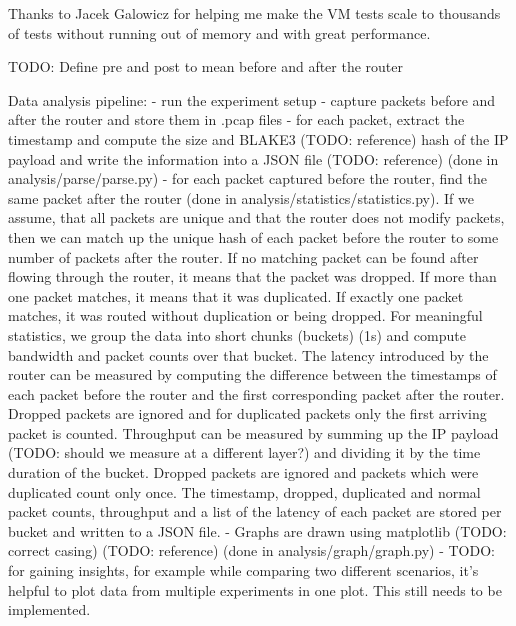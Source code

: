 Thanks to Jacek Galowicz for helping me make the VM tests scale to thousands of tests without running out of memory and with great performance.

TODO: Define pre and post to mean before and after the router

Data analysis pipeline:
- run the experiment setup
- capture packets before and after the router and store them in .pcap files
- for each packet, extract the timestamp and compute the size and BLAKE3 (TODO: reference) hash of the IP payload and write the information into a JSON file (TODO: reference) (done in analysis/parse/parse.py)
- for each packet captured before the router, find the same packet after the router (done in analysis/statistics/statistics.py). If we assume, that all packets are unique and that the router does not modify packets, then we can match up the unique hash of each packet before the router to some number of packets after the router. If no matching packet can be found after flowing through the router, it means that the packet was dropped. If more than one packet matches, it means that it was duplicated. If exactly one packet matches, it was routed without duplication or being dropped. For meaningful statistics, we group the data into short chunks (buckets) (1s) and compute bandwidth and packet counts over that bucket. The latency introduced by the router can be measured by computing the difference between the timestamps of each packet before the router and the first corresponding packet after the router. Dropped packets are ignored and for duplicated packets only the first arriving packet is counted. Throughput can be measured by summing up the IP payload (TODO: should we measure at a different layer?) and dividing it by the time duration of the bucket. Dropped packets are ignored and packets which were duplicated count only once. The timestamp, dropped, duplicated and normal packet counts, throughput and a list of the latency of each packet are stored per bucket and written to a JSON file.
- Graphs are drawn using matplotlib (TODO: correct casing) (TODO: reference) (done in analysis/graph/graph.py)
- TODO: for gaining insights, for example while comparing two different scenarios, it's helpful to plot data from multiple experiments in one plot. This still needs to be implemented.


